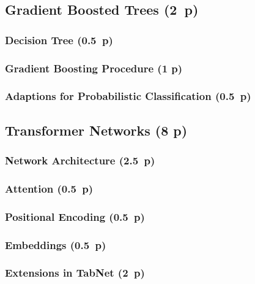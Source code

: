 \subsection{Gradient Boosted Trees (2~p)}\label{gradient-boosted-trees}

\subsubsection{Decision Tree (0.5~p)}\label{decision-tree}

\subsubsection{Gradient Boosting
  Procedure (1 p)}\label{gradient-boosting-procedure}

\subsubsection{Adaptions for Probabilistic
  Classification (0.5~p)}\label{adaptions-for-probablistic-classification}

\subsection{Transformer Networks (8 p)}\label{transformer-networks}

\subsubsection{Network Architecture (2.5~p)}\label{network-architecture}

\subsubsection{Attention (0.5~p)}\label{attention}

\subsubsection{Positional Encoding (0.5~p)}\label{positional-encoding}

\subsubsection{Embeddings (0.5~p)}\label{embeddings}

\subsubsection{Extensions in TabNet (2~p)}\label{extensions-in-tabnet}

